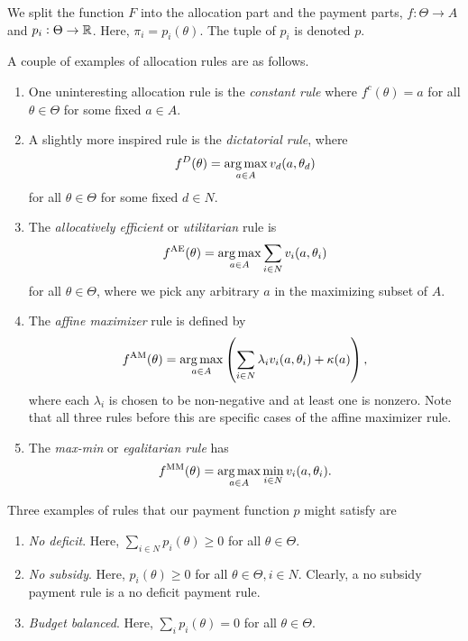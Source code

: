 		We split the function $F$ into the allocation part and the payment parts, $f : \Theta \to A$ and $p_i : \Theta \to \mathbb{R}$. Here, $\pi_i = p_i(\theta)$. The tuple of $p_i$ is denoted $p$.

		\begin{fex}
			\label{ex: payment alloc rules}
			A couple of examples of allocation rules are as follows.
			\begin{enumerate}
				\item One uninteresting allocation rule is the \emph{constant rule} where $f^c(\theta) = a$ for all $\theta \in \Theta$ for some fixed $a \in A$.

				\item A slightly more inspired rule is the \emph{dictatorial rule}, where
				\[ f^D(\theta) = \operatorname*{arg\,max}_{a \in A} v_d(a,\theta_d) \]
				for all $\theta \in \Theta$ for some fixed $d \in N$.
				
				\item The \emph{allocatively efficient} or \emph{utilitarian} rule is
				\[ f^{\text{AE}}(\theta) = \operatorname*{arg\,max}_{a \in A} \sum_{i \in N} v_i(a,\theta_i) \]
				for all $\theta \in \Theta$, where we pick any arbitrary $a$ in the maximizing subset of $A$.

				\item The \emph{affine maximizer} rule is defined by
				\[ f^{\text{AM}}(\theta) = \operatorname*{arg\,max}_{a \in A} \left( \sum_{i \in N} \lambda_i v_i(a,\theta_i) + \kappa(a) \right), \]
				where each $\lambda_i$ is chosen to be non-negative and at least one is nonzero. Note that all three rules before this are specific cases of the affine maximizer rule.

				\item The \emph{max-min} or \emph{egalitarian rule} has
				\[ f^\text{MM}(\theta) = \operatorname*{arg\,max}_{a \in A} \min_{i \in N} v_i(a,\theta_i). \]
			\end{enumerate}
		\end{fex}

		\begin{fex}
			\label{ex: payment rules}
			Three examples of rules that our payment function $p$ might satisfy are
			\begin{enumerate}
				\item \emph{No deficit}. Here, $\sum_{i \in N} p_i(\theta) \ge 0$ for all $\theta \in \Theta$.
				\item \emph{No subsidy}. Here, $p_i(\theta) \ge 0$ for all $\theta \in \Theta, i \in N$. Clearly, a no subsidy payment rule is a no deficit payment rule.
				\item \emph{Budget balanced}. Here, $\sum_i p_i(\theta) = 0$ for all $\theta \in \Theta$. 
			\end{enumerate}
		\end{fex}

